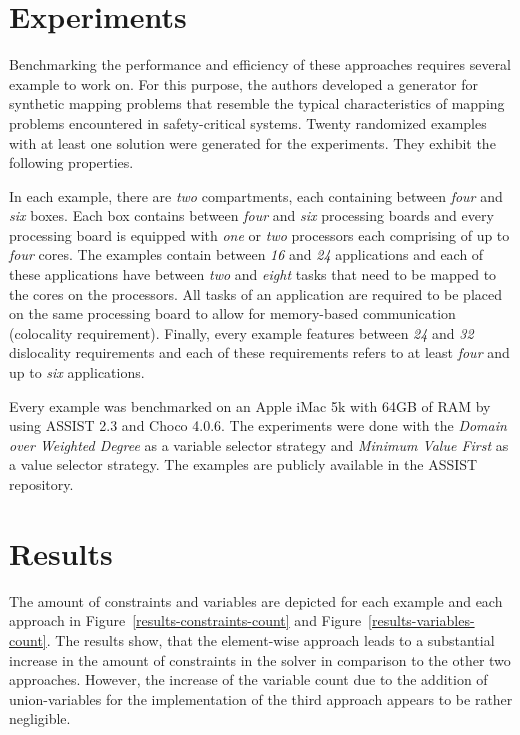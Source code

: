 \documentclass[conference]{IEEEtran}
\begin{document}
\section{Experiments}

Benchmarking the performance and efficiency of these approaches requires several example to work on.
For this purpose, the authors developed a generator for synthetic mapping problems that resemble the typical characteristics of mapping problems encountered in safety-critical systems.
Twenty randomized examples with at least one solution were generated for the experiments.
They exhibit the following properties.

In each example, there are \emph{two} compartments, each containing between \emph{four} and \emph{six} boxes.
Each box contains between \emph{four} and \emph{six} processing boards and every processing board is equipped with \emph{one} or \emph{two} processors each comprising of up to \emph{four} cores.
The examples contain between \emph{16} and \emph{24} applications and each of these applications have between \emph{two} and \emph{eight} tasks that need to be mapped to the cores on the processors.
All tasks of an application are required to be placed on the same processing board to allow for memory-based communication (colocality requirement).
Finally, every example features between \emph{24} and \emph{32} dislocality requirements and each of these requirements refers to at least \emph{four} and up to \emph{six} applications.

Every example was benchmarked on an Apple iMac 5k with 64GB of RAM by using ASSIST 2.3 and Choco 4.0.6.
The experiments were done with the \emph{Domain over Weighted Degree} as a variable selector strategy and \emph{Minimum Value First} as a value selector strategy.
The examples are publicly available in the ASSIST repository.

\section{Results}

The amount of constraints and variables are depicted for each example and each approach in Figure~\ref{results-constraints-count} and Figure~\ref{results-variables-count}.
The results show, that the element-wise approach leads to a substantial increase in the amount of constraints in the solver in comparison to the other two approaches.
However, the increase of the variable count due to the addition of union-variables for the implementation of the third approach appears to be rather negligible.
\end{document}
